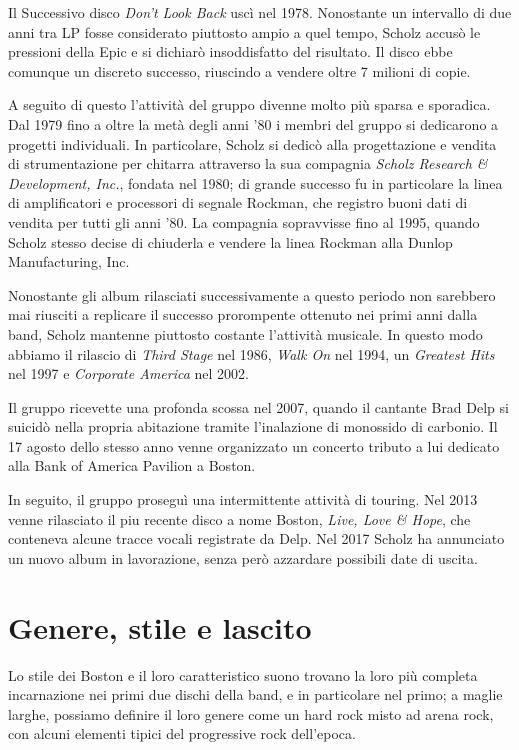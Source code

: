 \documentclass[class=book, crop=false, oneside, 12pt]{standalone}
\begin{document}
Il Successivo disco \emph{Don't Look Back} uscì nel 1978. Nonostante un intervallo di due anni tra LP fosse considerato piuttosto ampio a quel tempo, Scholz accusò le pressioni della Epic e si dichiarò insoddisfatto del risultato. Il disco ebbe comunque un discreto successo, riuscindo a vendere oltre 7 milioni di copie.

A seguito di questo l'attività del gruppo divenne molto più sparsa e sporadica. Dal 1979 fino a oltre la metà degli anni '80 i membri del gruppo si dedicarono a progetti individuali. In particolare, Scholz si dedicò alla progettazione e vendita di strumentazione per chitarra attraverso la sua compagnia \emph{Scholz Research \& Development, Inc.}, fondata nel 1980\cite{wiki:scholz_inc}; di grande successo fu in particolare la linea di amplificatori e processori di segnale Rockman, che registro buoni dati di vendita per tutti gli anni '80. La compagnia sopravvisse fino al 1995, quando Scholz stesso decise di chiuderla e vendere la linea Rockman alla Dunlop Manufacturing, Inc\cite{wiki:scholz_inc}. 

Nonostante gli album rilasciati successivamente a questo periodo non sarebbero mai riusciti a replicare il successo prorompente ottenuto nei primi anni dalla band, Scholz mantenne piuttosto costante l'attività musicale. In questo modo abbiamo il rilascio di \emph{Third Stage} nel 1986, \emph{Walk On} nel 1994, un \emph{Greatest Hits} nel 1997 e \emph{Corporate America} nel 2002.

Il gruppo ricevette una profonda scossa nel 2007, quando il cantante Brad Delp si suicidò nella propria abitazione tramite l'inalazione di monossido di carbonio. Il 17 agosto dello stesso anno venne organizzato un concerto tributo a lui dedicato alla Bank of America Pavilion a Boston.

In seguito, il gruppo proseguì una intermittente attività di touring. Nel 2013 venne rilasciato il piu recente disco a nome Boston, \emph{Live, Love \& Hope}, che conteneva alcune tracce vocali registrate da Delp. Nel 2017 Scholz ha annunciato un nuovo album in lavorazione, senza però azzardare possibili date di uscita.

\section{Genere, stile e lascito}
Lo stile dei Boston e il loro caratteristico suono trovano la loro più completa incarnazione nei primi due dischi della band, e in particolare nel primo; a maglie larghe, possiamo definire il loro genere come un hard rock misto ad arena rock\cite{book:rocknamerica}, con alcuni elementi tipici del progressive rock dell'epoca.
\end{document}
